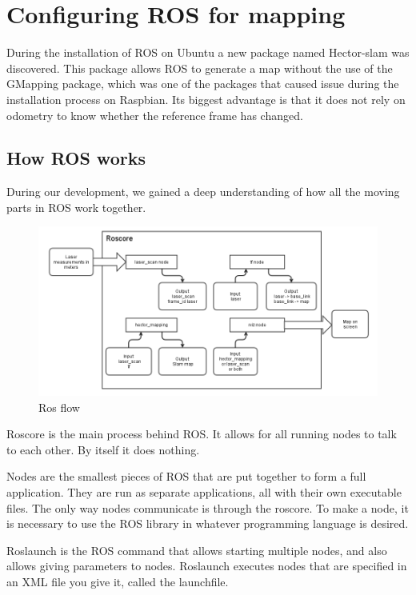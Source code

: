 \clearpage
\section{Configuring ROS for mapping}

During the installation of ROS on Ubuntu a new package named Hector-slam was discovered.
This package allows ROS to generate a map without the use of the GMapping package, which was one of the packages that caused issue during the installation process on Raspbian. Its biggest advantage is that it does not rely on odometry to know whether the reference frame has changed.

\subsection{How ROS works}
During our development, we gained a deep understanding of how all the moving parts in ROS work together.


\begin{figure}[H]
	\centering
	\includegraphics[width=1\linewidth]{images/ROSflow.png}
	\caption{Ros flow}
\end{figure}

Roscore is the main process behind ROS. It allows for all running nodes to talk to each other. By itself it does nothing.

Nodes are the smallest pieces of ROS that are put together to form a full application. They are run as separate applications, all with their own executable files. The only way nodes communicate is through the roscore. To make a node, it is necessary to use the ROS library in whatever programming language is desired.

Roslaunch is the ROS command that allows starting multiple nodes, and also allows giving parameters to nodes. Roslaunch executes nodes that are specified in an XML file you give it, called the launchfile.

